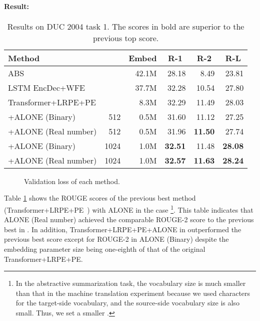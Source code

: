 \documentclass{article}
\begin{document}
\paragraph{Result:}
\begin{table}[!t]
  \centering
  \caption{Results on DUC 2004 task 1. The scores in bold are superior to the previous top score.\label{tab:headline}}
  \begin{tabular}{| l | r | r | r r r |} \hline
  Method &  & Embed & \multicolumn{1}{|c}{R-1} & \multicolumn{1}{c}{R-2} & \multicolumn{1}{c|}{R-L} \\ \hline
  \multicolumn{2}{|l|}{ABS~\cite{rush-chopra-weston:2015:EMNLP}} & 42.1M & 28.18 & 8.49 & 23.81 \\
  \multicolumn{2}{|l|}{LSTM EncDec+WFE~\cite{suzuki-nagata-2017-cutting}} & 37.7M & 32.28 & 10.54 & 27.80 \\
  \multicolumn{2}{|l|}{Transformer+LRPE+PE~\cite{takase-okazaki-2019-positional}} & 8.3M & 32.29 & 11.49 & 28.03 \\ \hline
  +ALONE (Binary)      & 512 & 0.5M & 31.60 & 11.12 & 27.25 \\
  +ALONE (Real number) & 512 & 0.5M & 31.96 & \textbf{11.50} & 27.74 \\
  +ALONE (Binary)      & 1024 & 1.0M & \textbf{32.51} & 11.48 & \textbf{28.08} \\
  +ALONE (Real number) & 1024 & 1.0M & \textbf{32.57} & \textbf{11.63} & \textbf{28.24} \\ \hline
  \end{tabular}
\end{table}

\begin{figure}
      \caption{Validation loss of each method.}
    \label{fig:valid_curve}
\end{figure}


Table \ref{tab:headline} shows the ROUGE scores of the previous best method (Transformer+LRPE+PE~\cite{takase-okazaki-2019-positional}) with ALONE in the case \footnote{In the abstractive summarization task, the vocabulary size is much smaller than that in the machine translation experiment because we used characters for the target-side vocabulary, and the source-side vocabulary size is also small. Thus, we set a smaller .}.
This table indicates that ALONE (Real number) achieved the comparable ROUGE-2 score to the previous best in .
In addition, Transformer+LRPE+PE+ALONE in  outperformed the previous best score except for ROUGE-2 in ALONE (Binary) despite the embedding parameter size being one-eighth of that of the original Transformer+LRPE+PE.
\end{document}
